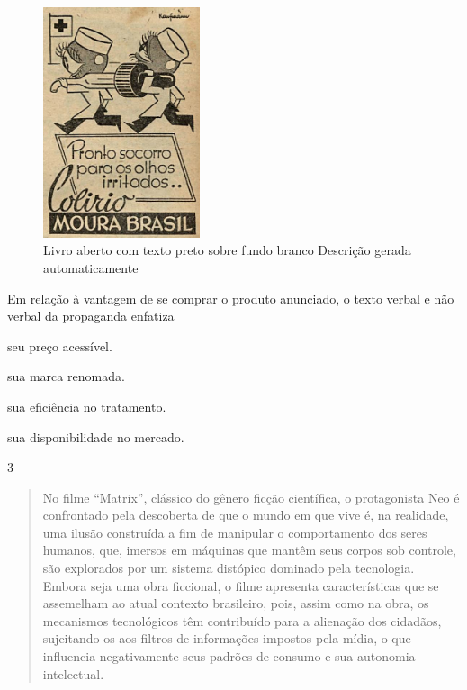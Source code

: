 \begin{figure}
\centering
\includegraphics[width=1.81474in,height=2.66429in]{./imgSAEB_8_POR/media/image35.png}
\caption{Livro aberto com texto preto sobre fundo branco Descrição
gerada automaticamente}
\end{figure}


Em relação à vantagem de se comprar o produto anunciado, o texto verbal
e não verbal da propaganda enfatiza

\begin{escolha}
\item seu preço acessível.

\item sua marca renomada.

\item sua eficiência no tratamento.

\item sua disponibilidade no mercado.
\end{escolha}

\num{3}

\begin{quote}
No filme ``Matrix'', clássico do gênero ficção científica, o
protagonista Neo é confrontado pela descoberta de que o mundo em que
vive é, na realidade, uma ilusão construída a fim de manipular o
comportamento dos seres humanos, que, imersos em máquinas que mantêm
seus corpos sob controle, são explorados por um sistema distópico
dominado pela tecnologia. Embora seja uma obra ficcional, o filme
apresenta características que se assemelham ao atual contexto
brasileiro, pois, assim como na obra, os mecanismos tecnológicos têm
contribuído para a alienação dos cidadãos, sujeitando-os aos filtros de
informações impostos pela mídia, o que influencia negativamente seus
padrões de consumo e sua autonomia intelectual.
\end{quote}

